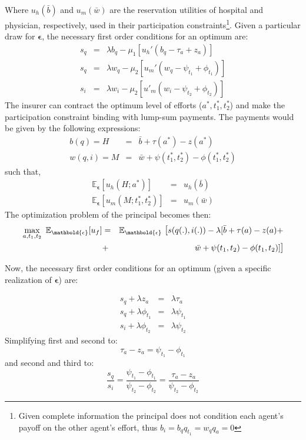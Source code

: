 \documentclass[12pt,letterpaper]{article}
\begin{document}
Where  $ u_h(\bar{b}) $ and $ u_m(\bar{w}) $ are the reservation utilities of hospital and physician, respectively, used in their participation constraints\footnote{Given complete information the principal does not condition each agent's payoff on the other agent's effort, thus $b_i=b_qq_{t_1}=w_qq_a=0 $}. Given a particular draw for $ \mathbold{\epsilon} $, the necessary first order conditions for an optimum are:
\begin{eqnarray*}
  s_q &=& \lambda b_q-\mu_1[u_h'(b_q-\tau_a+z_a)]\\
  s_q&=&
\lambda w_q-\mu_2[u_m'(w_q-\psi_{t_1}+\phi_{t_1})]\\
  s_i &=& \lambda w_i-\mu_2[u'_m(w_i-\psi_{t_2}+\phi_{t_2})]
\end{eqnarray*}
The insurer can contract the optimum level of efforts ($ a^*,t^*_1,t^*_2$) and make the participation constraint binding with lump-sum payments.  The payments would be given by the following expressions:
\begin{eqnarray*}
b(q)= H &=& \bar{b}+\tau(a^*)-z(a^*)\\
w(q,i)=  M&=& \bar{w}+\psi(t_1^*,t_2^*)-\phi(t_1^*,t_2^*)
\end{eqnarray*}
such that,
\begin{eqnarray*}
\mathbb{E}_{\mathbold{\epsilon}}[u_h(H;a^*)]&=&u_h(\bar{b})\\
\mathbb{E}_{\mathbold{\epsilon}}[u_m(M;t^*_1,t^*_2)]&=&u_m(\bar{w})
\end{eqnarray*}
The optimization problem of the principal becomes then:
\begin{eqnarray*}\label{maxf05}
\nonumber    \max\limits_{a,t_1,t_2}\
\mathbb{E}_{\mathbold{\epsilon}}[u_f]&=&\mathbb{E}_{\mathbold{\epsilon}}\text{\large{
[}}s(q(.),i(.))-\lambda[\bar{b}+\tau(a)-z(a)+\\
&+&\bar{w}+\psi(t_1,t_2)- \phi(t_1,t_2)]\text{\large{]}}
\end{eqnarray*}

Now, the necessary first order conditions for an optimum (given a specific realization of $\mathbold{\epsilon}$) are:

\begin{eqnarray}
  s_q+\lambda z_a &=& \lambda\tau_a \\
  s_q+\lambda\phi_{t_1}&=& \lambda\psi_{t_1} \\
  s_i+\lambda\phi_{t_2} &=& \lambda\psi_{t_2}
\end{eqnarray}
Simplifying first and second  to:
\begin{equation}\label{cpo1}
    \tau_a-z_a=\psi_{t_1}-\phi_{t_1}
\end{equation}
and second and third to:
\begin{equation}\label{cpo2}
\frac{s_q}{s_i}=\frac{\psi_{t_1}-\phi_{t_1}}{\psi_{t_2}-\phi_{t_2}}=\frac{\tau_a-z_a}
{\psi_{t_2}-\phi_{t_2}}
\end{equation}
\end{document}
